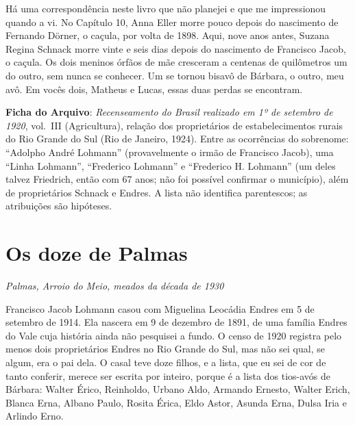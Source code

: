 \documentclass[
  brazilian,
  11pt,
  openany]{book}
\begin{document}
Há uma correspondência neste livro que não planejei e que me
impressionou quando a vi. No Capítulo 10, Anna Eller morre pouco depois
do nascimento de Fernando Dörner, o caçula, por volta de 1898. Aqui,
nove anos antes, Suzana Regina Schnack morre vinte e seis dias depois do
nascimento de Francisco Jacob, o caçula. Os dois meninos órfãos de mãe
cresceram a centenas de quilômetros um do outro, sem nunca se conhecer.
Um se tornou bisavô de Bárbara, o outro, meu avô. Em vocês dois, Matheus
e Lucas, essas duas perdas se encontram.

\begin{ficha}

\textbf{Ficha do Arquivo}: \emph{Recenseamento do Brasil realizado em 1º
de setembro de 1920}, vol.~III (Agricultura), relação dos proprietários
de estabelecimentos rurais do Rio Grande do Sul (Rio de Janeiro, 1924).
Entre as ocorrências do sobrenome: ``Adolpho André Lohmann''
(provavelmente o irmão de Francisco Jacob), uma ``Linha Lohmann'',
``Frederico Lohmann'' e ``Frederico H. Lohmann'' (um deles talvez
Friedrich, então com 67 anos; não foi possível confirmar o município),
além de proprietários Schnack e Endres. A lista não identifica
parentescos; as atribuições são hipóteses.

\end{ficha}

\section{Os doze de Palmas}\label{os-doze-de-palmas}

\emph{Palmas, Arroio do Meio, meados da década de 1930}

Francisco Jacob Lohmann casou com Miguelina Leocádia Endres em 5 de
setembro de 1914. Ela nascera em 9 de dezembro de 1891, de uma família
Endres do Vale cuja história ainda não pesquisei a fundo. O censo de
1920 registra pelo menos dois proprietários Endres no Rio Grande do Sul,
mas não sei qual, se algum, era o pai dela. O casal teve doze filhos, e
a lista, que eu sei de cor de tanto conferir, merece ser escrita por
inteiro, porque é a lista dos tios-avós de Bárbara: Walter Érico,
Reinholdo, Urbano Aldo, Armando Ernesto, Walter Erich, Blanca Erna,
Albano Paulo, Rosita Érica, Eldo Astor, Asunda Erna, Dulsa Iria e
Arlindo Erno.
\end{document}
